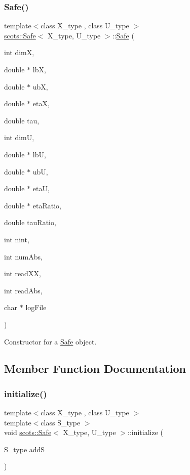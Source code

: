 \subsubsection{\texorpdfstring{Safe()}{Safe()}}
{\footnotesize\ttfamily template$<$class X\+\_\+type , class U\+\_\+type $>$ \\
\hyperlink{classscots_1_1Safe}{scots\+::\+Safe}$<$ X\+\_\+type, U\+\_\+type $>$\+::\hyperlink{classscots_1_1Safe}{Safe} (\begin{DoxyParamCaption}\item[{int}]{dimX,  }\item[{double $\ast$}]{lbX,  }\item[{double $\ast$}]{ubX,  }\item[{double $\ast$}]{etaX,  }\item[{double}]{tau,  }\item[{int}]{dimU,  }\item[{double $\ast$}]{lbU,  }\item[{double $\ast$}]{ubU,  }\item[{double $\ast$}]{etaU,  }\item[{double $\ast$}]{eta\+Ratio,  }\item[{double}]{tau\+Ratio,  }\item[{int}]{nint,  }\item[{int}]{num\+Abs,  }\item[{int}]{read\+XX,  }\item[{int}]{read\+Abs,  }\item[{char $\ast$}]{log\+File }\end{DoxyParamCaption})\hspace{0.3cm}{\ttfamily [inline]}}

Constructor for a \hyperlink{classscots_1_1Safe}{Safe} object. 

\subsection{Member Function Documentation}
\mbox{\label{classscots_1_1Safe_af43dd97d2d0a63b06b72e9a435e70fcf}} 
\subsubsection{\texorpdfstring{initialize()}{initialize()}}
{\footnotesize\ttfamily template$<$class X\+\_\+type , class U\+\_\+type $>$ \\
template$<$class S\+\_\+type $>$ \\
void \hyperlink{classscots_1_1Safe}{scots\+::\+Safe}$<$ X\+\_\+type, U\+\_\+type $>$\+::initialize (\begin{DoxyParamCaption}\item[{S\+\_\+type}]{addS }\end{DoxyParamCaption})\hspace{0.3cm}{\ttfamily [inline]}}

